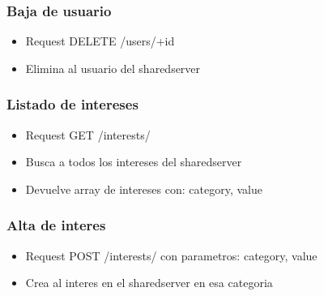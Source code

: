 \documentclass[letterpaper,10pt,english]{sphinxmanual}
\begin{document}
\subsubsection{Baja de usuario}
\label{manuals:baja-de-usuario}\begin{itemize}
\item {} 
Request DELETE /users/+id

\item {} 
Elimina al usuario del sharedserver

\end{itemize}


\subsubsection{Listado de intereses}
\label{manuals:listado-de-intereses}\begin{itemize}
\item {} 
Request GET /interests/

\item {} 
Busca a todos los intereses del sharedserver

\item {} 
Devuelve array de intereses con: category, value

\end{itemize}


\subsubsection{Alta de interes}
\label{manuals:alta-de-interes}\begin{itemize}
\item {} 
Request POST /interests/ con parametros: category, value

\item {} 
Crea al interes en el sharedserver en esa categoria

\end{itemize}
\end{document}
